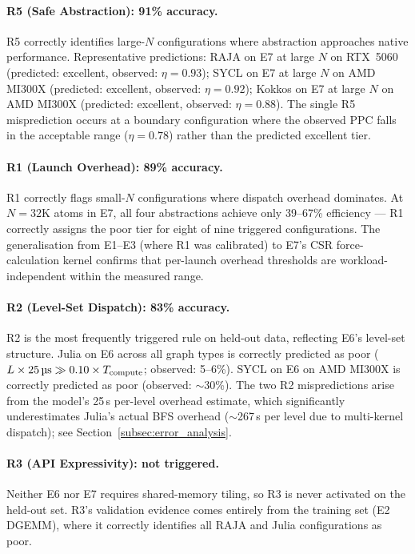 \paragraph{R5 (Safe Abstraction): 91\% accuracy.}
R5 correctly identifies large-$N$ configurations where abstraction
approaches native performance. Representative predictions: RAJA on E7 at
large $N$ on RTX~5060 (predicted: excellent, observed: $\eta = 0.93$);
SYCL on E7 at large $N$ on AMD MI300X (predicted: excellent, observed:
$\eta = 0.92$); Kokkos on E7 at large $N$ on AMD MI300X (predicted:
excellent, observed: $\eta = 0.88$). The single R5 misprediction occurs
at a boundary configuration where the observed PPC falls in the acceptable
range ($\eta = 0.78$) rather than the predicted excellent tier.

\paragraph{R1 (Launch Overhead): 89\% accuracy.}
R1 correctly flags small-$N$ configurations where dispatch overhead
dominates. At $N = 32$K atoms in E7, all four abstractions achieve only
39--67\% efficiency --- R1 correctly assigns the poor tier for eight of
nine triggered configurations. The generalisation from E1--E3 (where R1
was calibrated) to E7's CSR force-calculation kernel confirms that
per-launch overhead thresholds are workload-independent within the
measured range.

\paragraph{R2 (Level-Set Dispatch): 83\% accuracy.}
R2 is the most frequently triggered rule on held-out data, reflecting
E6's level-set structure. Julia on E6 across all graph types is
correctly predicted as poor ($L \times 25\,\text{\textmu{}s} \gg
0.10 \times T_{\text{compute}}$; observed: 5--6\%). SYCL on E6 on AMD
MI300X is correctly predicted as poor (observed: $\sim$30\%). The two
R2 mispredictions arise from the model's 25\,\textmu{}s per-level
overhead estimate, which significantly underestimates Julia's actual
BFS overhead ($\sim$267\,\textmu{}s per level due to multi-kernel
dispatch); see Section~\ref{subsec:error_analysis}.

\paragraph{R3 (API Expressivity): not triggered.}
Neither E6 nor E7 requires shared-memory tiling, so R3 is never activated
on the held-out set. R3's validation evidence comes entirely from the
training set (E2 DGEMM), where it correctly identifies all RAJA and Julia
configurations as poor.

